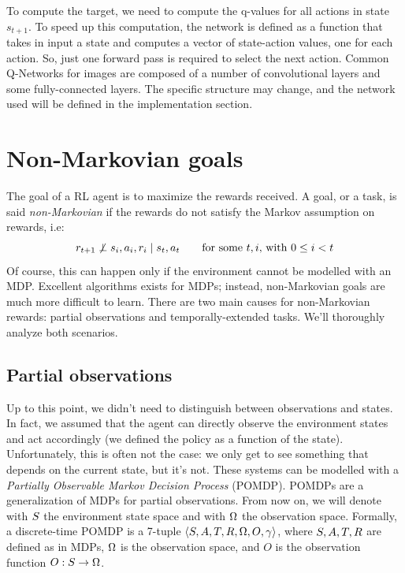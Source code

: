 To compute the target, we need to compute the q-values for all actions in
state $s_{t+1}$. To speed up this computation, the network is defined as a
function that takes in input a state and computes a vector of state-action
values, one for each action. So, just one forward pass is required to select
the next action. Common Q-Networks for images are composed of a number of
convolutional layers and some fully-connected layers. The specific structure
may change, and the network used will be defined in the implementation section.


\section{Non-Markovian goals}

\label{sec:non-markov}

The goal of a RL agent is to maximize the rewards received.  A goal, or a
task, is said \emph{non-Markovian} if the rewards do not satisfy the Markov
assumption on rewards, i.e:
\begin{equation}
	r_{t+1} \not\perp s_i, a_i, r_i \mid s_t, a_t
	\qquad \text{for some $t, i$, with $0 \le i < t$}
	\label{eq:markov-rewards}
\end{equation}
Of course, this can happen only if the environment cannot be modelled with an
MDP. Excellent algorithms exists for MDPs; instead, non-Markovian goals are
much more difficult to learn.  There are two main causes for non-Markovian
rewards: partial observations and temporally-extended tasks. We'll thoroughly
analyze both scenarios.


\subsection{Partial observations}

Up to this point, we didn't need to distinguish between observations and
states. In fact, we assumed that the agent can directly observe the
environment states and act accordingly (we defined the policy as a function of
the state). Unfortunately, this is often not the case: we only get to see
something that depends on the current state, but it's not. These systems can
be modelled with a \emph{Partially Observable Markov Decision Process}
(POMDP).
POMDPs are a generalization of MDPs for partial observations. From now on, we
will denote with $S$ the environment state space and with $\Omega$ the
observation space. Formally, a discrete-time POMDP is a 7-tuple ${\langle
S, A, T, R, \Omega, O, \gamma \rangle}$, where $S, A, T, R$ are
defined as in MDPs, $\Omega$ is the observation space, and $O$ is the
observation function ${O: S \to \Omega}$.

